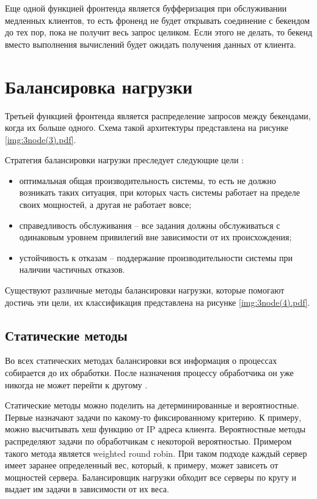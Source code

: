 Еще одной функцией фронтенда является буфферизация при обслуживании медленных клиентов, то есть фроненд не будет открывать соединение с бекендом до тех пор, пока не получит весь запрос целиком. Если этого не делать, то бекенд вместо выполнения вычислений будет ожидать получения данных от клиента.

\section{Балансировка нагрузки}\label{sec:load_balance}

Третьей функцией фронтенда является распределение запросов между бекендами, когда их больше одного. Схема такой архитектуры представлена на рисунке \ref{img:3node(3).pdf}.


Стратегия балансировки нагрузки преследует следующие цели \cite{cyberlenin2}:
\begin{itemize}
	\item оптимальная общая производительность системы, то есть не должно возникать таких ситуация, при которых часть системы работает на пределе своих мощностей, а другая не работает вовсе;
	\item справедливость обслуживания -- все задания должны обслуживаться с одинаковым уровнем привилегий вне зависимости от их происхождения;
	\item устойчивость к отказам -- поддержание производительности системы при наличии частичных отказов.
\end{itemize}

Существуют различные методы балансировки нагрузки, которые помогают достичь эти цели, их классификация представлена на рисунке \ref{img:3node(4).pdf}.



\subsection{Статические методы}

Во всех статических методах балансировки вся информация о процессах собирается до их обработки. После назначения процессу обработчика он уже никогда не может перейти к другому \cite{cyberlenin2}.

Статические методы можно поделить на детерминированные и вероятностные. Первые назначают задачи по какому-то фиксированному критерию. К примеру, можно высчитывать хеш функцию от IP адреса клиента. Вероятностные методы распределяют задачи по обработчикам с некоторой вероятностью. Примером такого метода является weighted round robin. При таком подходе каждый сервер имеет заранее определенный вес, который, к примеру, может зависеть от мощностей сервера. Балансировщик нагрузки обходит все серверы по кругу и выдает им задачи в зависимости от их веса.

